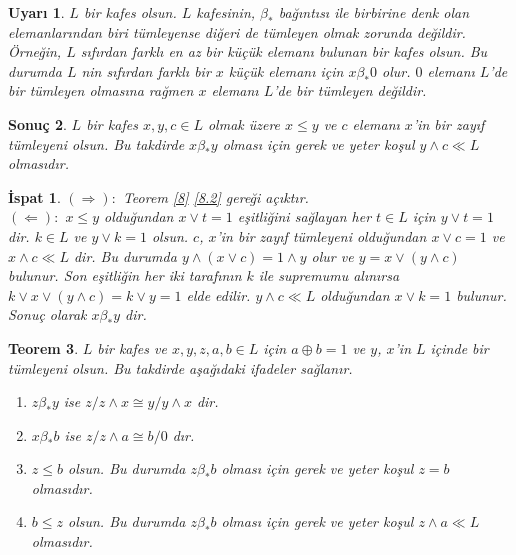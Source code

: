 \documentclass[a4paper,12pt]{article}
\numberwithin{equation}{section}
\theoremstyle{italik}
\newtheorem{teorem}{Teorem}[section]
\newtheorem{uyari}[teorem]{Uyarı}
\newtheorem{sonuc}[teorem]{Sonuç}
\newtheorem*{ispat}{İspat}
\begin{document}
\begin{uyari}
  $ L $ bir kafes olsun. $ L $ kafesinin, $ \beta_* $ bağıntısı ile birbirine denk olan 
  elemanlarından biri tümleyense diğeri de tümleyen olmak zorunda değildir. Örneğin, 
  $ L $ sıfırdan farklı en az bir küçük elemanı bulunan bir kafes olsun. Bu durumda $ L $ 
  nin sıfırdan farklı bir $ x $ küçük elemanı için $ x \beta_* 0 $ olur. $ 0 $ elemanı $ L $'de bir 
  tümleyen olmasına rağmen $ x $ elemanı $ L $'de bir tümleyen değildir. 
\end{uyari}


\begin{sonuc}\label{10}
  $ L $ bir kafes $ x,y,c \in L $ olmak üzere $ x \leq y $ ve $ c $ elemanı $ x $'in bir zayıf tümleyeni olsun. 
  Bu takdirde $ x \beta_* y $ olması için gerek ve yeter koşul $ y \wedge c \ll L $ olmasıdır.
\end{sonuc}
\begin{ispat}
  $ ( \Rightarrow ):$ Teorem \ref{8} \ref{8.2} gereği açıktır. \\
  $ ( \Leftarrow ):$ $ x \leq y $ olduğundan $ x \vee t = 1 $ eşitliğini sağlayan her $ t \in L $ için 
  $ y \vee t = 1 $ dir. $ k \in L $ ve $ y \vee k = 1 $ olsun. $ c $, $x$'in bir zayıf 
  tümleyeni olduğundan $ x \vee c=1 $ ve $ x \wedge c \ll L $ dir. Bu durumda 
  $ y \wedge ( x \vee c ) = 1 \wedge y $ olur ve $ y = x \vee ( y \wedge c ) $ bulunur. 
  Son eşitliğin her iki tarafının $ k $ ile supremumu alınırsa 
  $ k \vee x \vee ( y \wedge c ) = k \vee y = 1 $ elde edilir. 
  $ y \wedge c \ll L $ olduğundan  $ x \vee k = 1 $ bulunur. 
  Sonuç olarak $ x \beta_* y $ dir.
\end{ispat}


\begin{teorem}\label{11}
  $ L $ bir kafes ve $ x,y,z,a,b \in L $ için $ a \oplus b = 1 $ ve $ y $, $ x $'in $ L $ içinde bir tümleyeni 
  olsun. Bu takdirde aşağıdaki ifadeler sağlanır. 
  \begin{enumerate}[label=(\roman{*}), ref=(\roman{*})]
    \item $ z \beta_* y $ ise $ z / z \wedge x \cong y / y \wedge x $ dir.\label{11.1}
    \item $ x \beta_* b $ ise $ z / z \wedge a \cong b / 0 $ dır.\label{11.2}
    \item $ z \leq b $ olsun. Bu durumda $ z \beta_* b $ olması için gerek ve yeter koşul $ z = b $ olmasıdır.\label{11.3}
    \item $ b \leq z $ olsun. Bu durumda $ z \beta_* b $ olması için gerek ve yeter koşul $ z \wedge a \ll L $ olmasıdır.\label{11.4}
  \end{enumerate}
\end{teorem}
\end{document}
